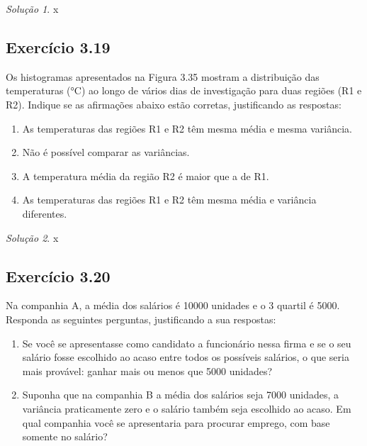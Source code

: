 \documentclass[
]{latex/krantz}
\providecommand{\tightlist}{%
  \setlength{\itemsep}{0pt}\setlength{\parskip}{0pt}}
\theoremstyle{definition}
\theoremstyle{definition}
\theoremstyle{definition}
\theoremstyle{definition}
\theoremstyle{remark}
\newtheorem*{solution}{Solução}
\begin{document}
\begin{solution}
x
\end{solution}

\hypertarget{exr3-19}{%
\subsection*{Exercício 3.19}\label{exr3-19}}

Os histogramas apresentados na Figura 3.35 mostram a distribuição das temperaturas (°C) ao longo de vários dias de investigação para duas regiões (R1 e R2). Indique se as afirmações abaixo estão corretas, justificando as respostas:

\begin{enumerate}
\def\labelenumi{\alph{enumi})}
\tightlist
\item
  As temperaturas das regiões R1 e R2 têm mesma média e mesma variância.
\item
  Não é possível comparar as variâncias.
\item
  A temperatura média da região R2 é maior que a de R1.
\item
  As temperaturas das regiões R1 e R2 têm mesma média e variância diferentes.
\end{enumerate}

\begin{solution}
x
\end{solution}

\hypertarget{exr3-20}{%
\subsection*{Exercício 3.20}\label{exr3-20}}

Na companhia A, a média dos salários é 10000 unidades e o 3 quartil é 5000. Responda as seguintes perguntas, justificando a sua respostas:

\begin{enumerate}
\def\labelenumi{\alph{enumi})}
\tightlist
\item
  Se você se apresentasse como candidato a funcionário nessa firma e se o seu salário fosse escolhido ao acaso entre todos os possíveis salários, o que seria mais provável: ganhar mais ou menos que 5000 unidades?
\item
  Suponha que na companhia B a média dos salários seja 7000 unidades, a variância praticamente zero e o salário também seja escolhido ao acaso. Em qual companhia você se apresentaria para procurar emprego, com base somente no salário?
\end{enumerate}
\end{document}
